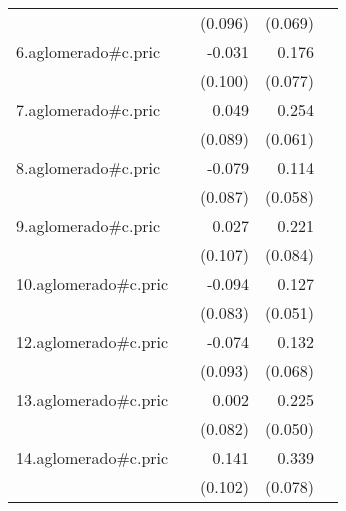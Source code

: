 {\begin{longtable}{l*{4}{D{.}{.}{-1}}}
            &                     &     (0.096)         &     (0.069)         &                     \\
\addlinespace
6.aglomerado#c.pric&                     &      -0.031         &       0.176\sym{*}  &                     \\
            &                     &     (0.100)         &     (0.077)         &                     \\
\addlinespace
7.aglomerado#c.pric&                     &       0.049         &       0.254\sym{***}&                     \\
            &                     &     (0.089)         &     (0.061)         &                     \\
\addlinespace
8.aglomerado#c.pric&                     &      -0.079         &       0.114\sym{*}  &                     \\
            &                     &     (0.087)         &     (0.058)         &                     \\
\addlinespace
9.aglomerado#c.pric&                     &       0.027         &       0.221\sym{**} &                     \\
            &                     &     (0.107)         &     (0.084)         &                     \\
\addlinespace
10.aglomerado#c.pric&                     &      -0.094         &       0.127\sym{*}  &                     \\
            &                     &     (0.083)         &     (0.051)         &                     \\
\addlinespace
12.aglomerado#c.pric&                     &      -0.074         &       0.132         &                     \\
            &                     &     (0.093)         &     (0.068)         &                     \\
\addlinespace
13.aglomerado#c.pric&                     &       0.002         &       0.225\sym{***}&                     \\
            &                     &     (0.082)         &     (0.050)         &                     \\
\addlinespace
14.aglomerado#c.pric&                     &       0.141         &       0.339\sym{***}&                     \\
            &                     &     (0.102)         &     (0.078)         &                     \\

\end{longtable}}
